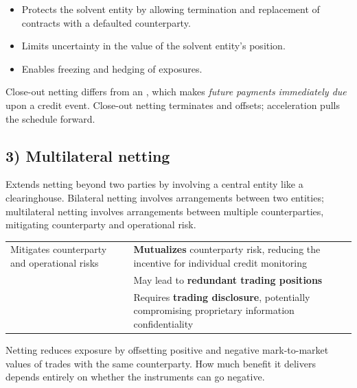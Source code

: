 \begin{itemize}
\item Protects the solvent entity by allowing termination and replacement of
contracts with a defaulted counterparty.
\item Limits uncertainty in the value of the solvent entity's position.
\item Enables freezing and hedging of exposures.
\end{itemize}

\begin{crtrapbox}
Close-out netting differs from an , which makes
\emph{future payments immediately due} upon a credit event. Close-out netting
terminates and offsets; acceleration pulls the schedule forward.
\end{crtrapbox}

\subsection*{3) Multilateral netting}

Extends netting beyond two parties by involving a central entity like a
clearinghouse. Bilateral netting involves arrangements between two entities;
multilateral netting involves arrangements between multiple counterparties,
mitigating counterparty and operational risk.

\begin{center}
\footnotesize
\begin{tabular}{L{7.0cm} L{7.5cm}}
\toprule
{} &  \\
\midrule
Mitigates counterparty and operational risks &
  \textbf{Mutualizes} counterparty risk, reducing the incentive for individual
  credit monitoring \\
 & May lead to \textbf{redundant trading positions} \\
 & Requires \textbf{trading disclosure}, potentially compromising proprietary
  information confidentiality \\
\bottomrule
\end{tabular}
\end{center}


Netting reduces exposure by offsetting positive and negative mark-to-market
values of trades with the same counterparty. How much benefit it delivers depends
entirely on whether the instruments can go negative.

